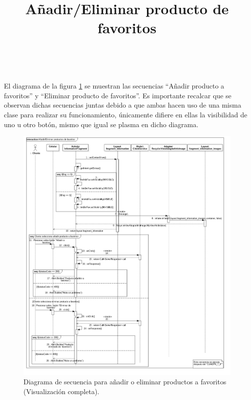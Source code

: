 \title{\textbf{Añadir/Eliminar producto de favoritos}}
\\ \par
El diagrama de la figura \ref{image:addDelFav} se muestran las secuencias ``Añadir producto a favoritos'' y ``Eliminar producto de favoritos''. Es importante recalcar que se observan dichas secuencias juntas debido a que ambas hacen uso de una misma clase para realizar su funcionamiento, únicamente difiere en ellas la visibilidad de uno u otro botón, mismo que igual se plasma en dicho diagrama.
\FloatBarrier
\begin{figure}[htbp!]
		\centering
			\includegraphics[width=.96 \textwidth]{imagenes/Diagramas_UserApp/Nuevos_diagramas/anadir_eliminarFav}
		\caption{Diagrama de secuencia para añadir o eliminar productos a favoritos (Visualización completa).}
		\label{image:addDelFav}
\end{figure}
\FloatBarrier

